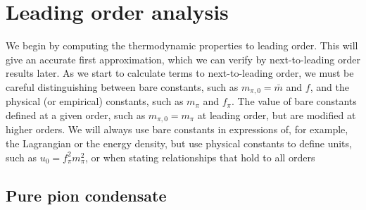 \section{Leading order analysis}
\label{section: thermodynamics leading order}

We begin by computing the thermodynamic properties to leading order.
This will give an accurate first approximation, which we can verify by next-to-leading order results later.
As we start to calculate terms to next-to-leading order, we must be careful distinguishing between bare constants, such as $m_{\pi,0} = \bar m$ and $f$, and the physical (or empirical) constants, such as $m_\pi$ and $f_\pi$.
The value of bare constants defined at a given order, such as $m_{\pi,0} = m_\pi$ at leading order, but are modified at higher orders.
We will always use bare constants in expressions of, for example, the Lagrangian or the energy density, but use physical constants to define units, such as $u_0 = f_\pi^2 m_\pi^2$, or when stating relationships that hold to all orders



\subsection{Pure pion condensate}
\label{subsection: pure pion condensate}


